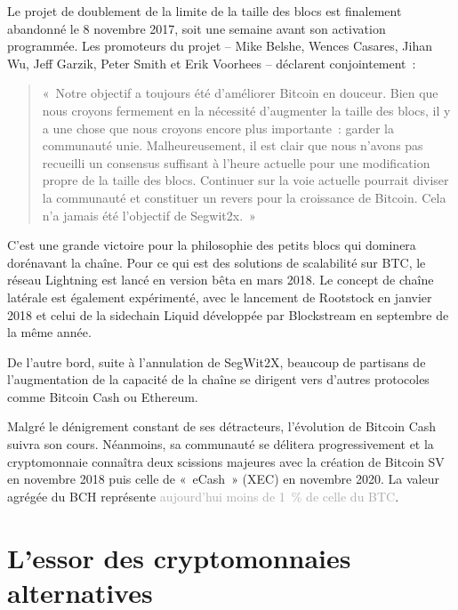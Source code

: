 Le projet de doublement de la limite de la taille des blocs est finalement abandonné le 8 novembre 2017, soit une semaine avant son activation programmée. Les promoteurs du projet -- Mike Belshe, Wences Casares, Jihan Wu, Jeff Garzik, Peter Smith et Erik Voorhees -- déclarent conjointement~:

\begin{quote}
«~Notre objectif a toujours été d'améliorer Bitcoin en douceur. Bien que nous croyons fermement en la nécessité d'augmenter la taille des blocs, il y a une chose que nous croyons encore plus importante~: garder la communauté unie. Malheureusement, il est clair que nous n'avons pas recueilli un consensus suffisant à l'heure actuelle pour une modification propre de la taille des blocs. Continuer sur la voie actuelle pourrait diviser la communauté et constituer un revers pour la croissance de Bitcoin. Cela n'a jamais été l'objectif de Segwit2x.~»
\end{quote}

C'est une grande victoire pour la philosophie des petits blocs qui dominera dorénavant la chaîne. Pour ce qui est des solutions de scalabilité sur BTC, le réseau Lightning est lancé en version bêta en mars 2018. Le concept de chaîne latérale est également expérimenté, avec le lancement de Rootstock en janvier 2018 et celui de la sidechain Liquid développée par Blockstream en septembre de la même année.

De l'autre bord, suite à l'annulation de SegWit2X, beaucoup de partisans de l'augmentation de la capacité de la chaîne se dirigent vers d'autres protocoles comme Bitcoin Cash ou Ethereum.

Malgré le dénigrement constant de ses détracteurs, l'évolution de Bitcoin Cash suivra son cours. Néanmoins, sa communauté se délitera progressivement et la cryptomonnaie connaîtra deux scissions majeures avec la création de Bitcoin SV en novembre 2018 puis celle de «~eCash~» (XEC) en novembre 2020. La valeur agrégée du BCH représente \textcolor{darkgray}{aujourd'hui moins de 1~\% de celle du BTC}.

\section*{L'essor des cryptomonnaies alternatives}

